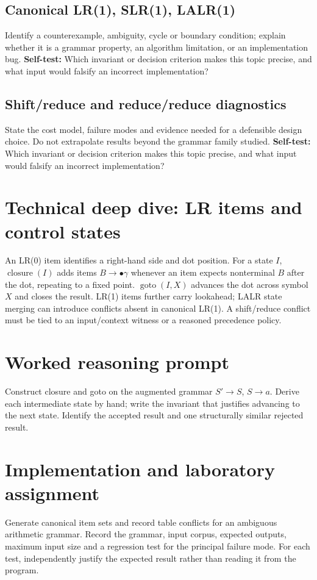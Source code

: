 \documentclass[11pt,letterpaper]{article}
\begin{document}
\subsection{Canonical LR(1), SLR(1), LALR(1)}
Identify a counterexample, ambiguity, cycle or boundary condition; explain whether it is a grammar property, an algorithm limitation, or an implementation bug.
\textbf{Self-test:} Which invariant or decision criterion makes this topic precise, and what input would falsify an incorrect implementation?
\subsection{Shift/reduce and reduce/reduce diagnostics}
State the cost model, failure modes and evidence needed for a defensible design choice. Do not extrapolate results beyond the grammar family studied.
\textbf{Self-test:} Which invariant or decision criterion makes this topic precise, and what input would falsify an incorrect implementation?
\section{Technical deep dive: LR items and control states}
An LR(0) item identifies a right-hand side and dot position. For a state $I$, $\operatorname{closure}(I)$ adds items $B\to\bullet\gamma$ whenever an item expects nonterminal $B$ after the dot, repeating to a fixed point. $\operatorname{goto}(I,X)$ advances the dot across symbol $X$ and closes the result. LR(1) items further carry lookahead; LALR state merging can introduce conflicts absent in canonical LR(1). A shift/reduce conflict must be tied to an input/context witness or a reasoned precedence policy.
\section{Worked reasoning prompt}
Construct closure and goto on the augmented grammar $S\prime\to S$, $S\to a$. Derive each intermediate state by hand; write the invariant that justifies advancing to the next state. Identify the accepted result and one structurally similar rejected result.
\section{Implementation and laboratory assignment}
Generate canonical item sets and record table conflicts for an ambiguous arithmetic grammar. Record the grammar, input corpus, expected outputs, maximum input size and a regression test for the principal failure mode. For each test, independently justify the expected result rather than reading it from the program.
\end{document}
